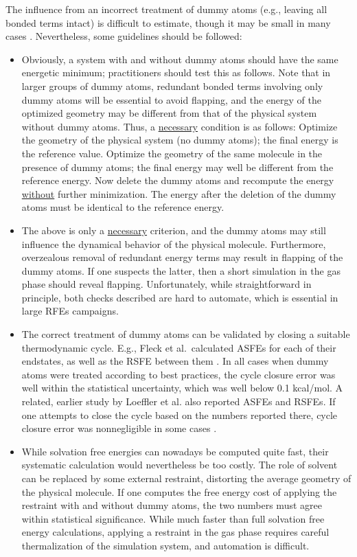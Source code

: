 \documentclass[9pt,bestpractices]{livecoms}
\begin{document}
The influence from an incorrect treatment of dummy atoms (e.g., leaving all bonded terms intact) is difficult to estimate, though it may be small in many cases \cite{Fleck_2021}. Nevertheless, some guidelines should be followed:
\begin{itemize}
  \item Obviously, a system with and without dummy atoms should have the same energetic minimum; practitioners should test this as follows. Note that in larger groups of dummy atoms, redundant bonded terms involving only dummy atoms will be essential to avoid flapping, and the energy of the optimized geometry may be different from that of the physical system without dummy atoms. Thus, a \underline{necessary} condition is as follows: Optimize the geometry of the physical system (no dummy atoms); the final energy is the reference value. Optimize the geometry of the same molecule in the presence of dummy atoms; the final energy may well be different from the reference energy. Now delete the dummy atoms and recompute the energy \underline{without} further minimization. The energy after the deletion of the dummy atoms must be identical to the reference energy. 
\item The above is only a \underline{necessary} criterion, and the dummy atoms may still influence the dynamical behavior of the physical molecule. Furthermore, overzealous removal of redundant energy terms may result in flapping of the dummy atoms. If one suspects the latter, then a short simulation in the gas phase should reveal flapping. Unfortunately, while straightforward in principle, both checks described are hard to automate, which is essential in large RFEs campaigns. 
\item The correct treatment of dummy atoms can be validated by closing a suitable thermodynamic cycle.  E.g., Fleck et al.\ calculated ASFEs for each of their endstates, as well as the RSFE between them \cite{Fleck_2021}. In all cases when dummy atoms were treated according to best practices, the cycle closure error was well within the statistical uncertainty, which was well below 0.1 kcal/mol. A related, earlier study by Loeffler et al. also reported ASFEs and RSFEs. If one attempts to close the cycle based on the numbers reported there, cycle closure error was nonnegligible in some cases \cite{loeffler2018reproducibility}. 
\item While solvation free energies can nowadays be computed quite fast, their systematic calculation would nevertheless be too costly. The role of solvent can be replaced by some external restraint, distorting the average geometry of the physical molecule. If one computes the free energy cost of applying the restraint with and without dummy atoms, the two numbers must agree within statistical significance. While much faster than full solvation free energy calculations, applying a restraint in the gas phase requires careful thermalization of the simulation system, and automation is difficult.
  \end{itemize}
\end{document}
